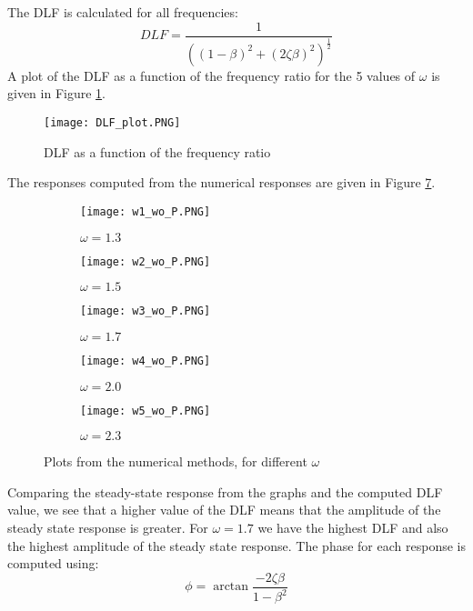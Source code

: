 \documentclass[11pt, a4paper, english, hidelinks]{NTNUoving}
\begin{document}
The DLF is calculated for all frequencies:
\begin{equation}
	\label{eq:DLF}
	DLF = \frac{1}{\left( (1-\beta)^2 + (2\zeta \beta)^2\right)^{\frac{1}{2}}}
\end{equation}
A plot of the DLF as a function of the frequency ratio for the 5 values of $\omega$ is given in Figure \ref{fig:DLF}. 
\begin{figure}
	\centering
	\texttt{[image: DLF\_plot.PNG]}
	\caption{DLF as a function of the frequency ratio}
	\label{fig:DLF}
\end{figure}
The responses computed from the numerical responses are given in Figure \ref{fig:SSresponse}. 
\begin{figure}
	\begin{subfigure}{.5\textwidth}
		\centering
		\texttt{[image: w1\_wo\_P.PNG]}
		\caption{$\omega = 1.3$}
		\label{fig:sfig1}
	\end{subfigure}%
	\begin{subfigure}{.5\textwidth}
		\centering
		\texttt{[image: w2\_wo\_P.PNG]}
		\caption{$\omega = 1.5$}
		\label{fig:sfig2}
	\end{subfigure}
	\begin{subfigure}{.5\textwidth}
		\centering
		\texttt{[image: w3\_wo\_P.PNG]}
		\caption{$\omega = 1.7$}
		\label{fig:sfig3}
	\end{subfigure}
	\begin{subfigure}{.5\textwidth}
		\centering
		\texttt{[image: w4\_wo\_P.PNG]}
		\caption{$\omega = 2.0$}
		\label{fig:sfig4}
	\end{subfigure}
	\begin{subfigure}{\textwidth}
		\centering
		\texttt{[image: w5\_wo\_P.PNG]}
		\caption{$\omega = 2.3$}
		\label{fig:sfig5}
	\end{subfigure}
	\caption{Plots from the numerical methods, for different $\omega$}
	\label{fig:SSresponse}
\end{figure}
Comparing the steady-state response from the graphs and the computed DLF value, we see that a higher value of the DLF means that the amplitude of the steady state response is greater. For $\omega = 1.7$ we have the highest DLF and also the highest amplitude of the steady state response. The phase for each response is computed using:
\begin{equation}
	\label{eq:phase}
	\phi = \arctan{\frac{-2\zeta\beta}{1-\beta^2}}
\end{equation}
\end{document}
